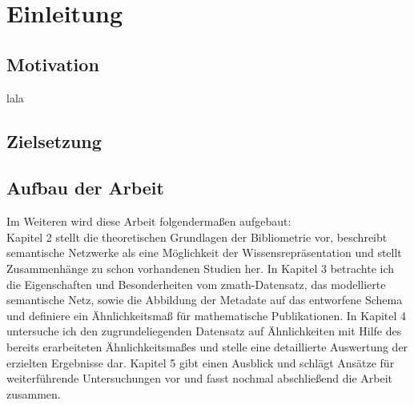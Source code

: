 \section{Einleitung}

\subsection{Motivation}
lala


\subsection{Zielsetzung}

\subsection{Aufbau der Arbeit}

Im Weiteren wird diese Arbeit folgendermaßen aufgebaut:
\\
Kapitel 2 stellt die theoretischen Grundlagen der Bibliometrie vor, beschreibt semantische Netzwerke als eine Möglichkeit der Wissensrepräsentation und stellt Zusammenhänge zu schon vorhandenen Studien her.
In Kapitel 3 betrachte ich die Eigenschaften und Besonderheiten vom zmath-Datensatz, das modellierte semantische Netz, sowie die Abbildung der Metadate auf das entworfene Schema und definiere ein Ähnlichkeitsmaß für mathematische Publikationen.
In Kapitel 4 untersuche ich den zugrundeliegenden Datensatz auf Ähnlichkeiten mit Hilfe des bereits erarbeiteten Ähnlichkeitsmaßes und stelle eine detaillierte Auswertung der erzielten Ergebnisse dar.
Kapitel 5 gibt einen Ausblick und schlägt Ansätze für weiterführende Untersuchungen vor und fasst nochmal abschließend die Arbeit zusammen.



